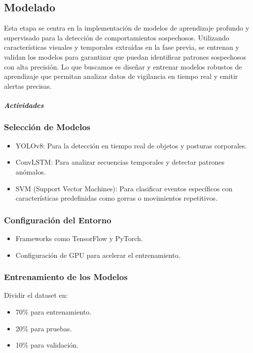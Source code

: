 \subsection{Modelado}
Esta etapa se centra en la implementación de modelos de aprendizaje profundo y supervisado para la detección de comportamientos sospechosos. Utilizando características visuales y temporales extraídas en la fase previa, se entrenan y validan los modelos para garantizar que puedan identificar patrones sospechosos con alta precisión.
Lo que buscamos es diseñar y entrenar modelos robustos de aprendizaje que permitan analizar datos de vigilancia en tiempo real y emitir alertas precisas.


\paragraph{\textit{Actividades}}

\subsubsection{Selección de Modelos}

\begin{itemize}
    \item YOLOv8: Para la detección en tiempo real de objetos y posturas corporales.
    \item ConvLSTM: Para analizar secuencias temporales y detectar patrones anómalos.
    \item SVM (Support Vector Machines): Para clasificar eventos específicos con características predefinidas como gorras o movimientos repetitivos.
\end{itemize}


\subsubsection{Configuración del Entorno}
\begin{itemize}
    \item Frameworks como TensorFlow y PyTorch.
    \item Configuración de GPU para acelerar el entrenamiento.
\end{itemize}


\subsubsection{Entrenamiento de los Modelos}
Dividir el dataset en:
\begin{itemize}
    \item 70\% para entrenamiento.
    \item 20\% para pruebas.
    \item 10\% para validación.
\end{itemize}

